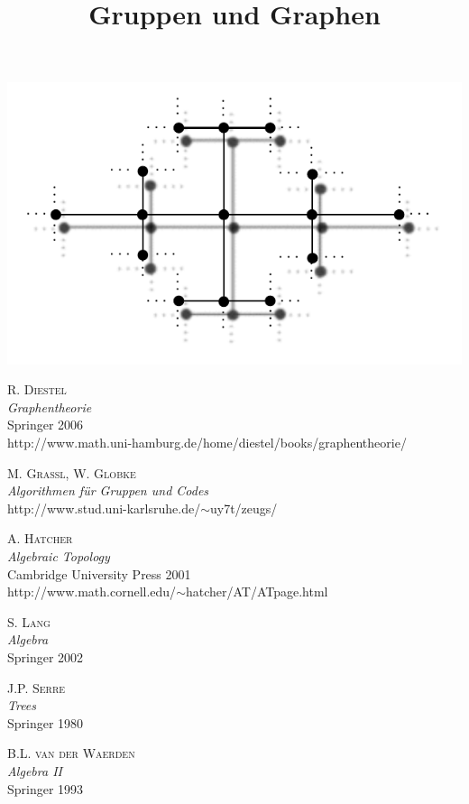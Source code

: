 \documentclass[a4paper, 12pt, twoside]{article}
\title{\Huge \textbf{
\textsf{Gruppen und Graphen}}}
\date{}
\begin{document}
\maketitle
\begin{center}
	\includegraphics{grugraImages/titel}
\end{center}
\newpage
\tableofcontents
\newpage









\appendix



\newpage
\begin{thebibliography}{10}

 \textsc{R. Diestel}\\
\textsl{Graphentheorie}\\
Springer 2006\\
\textsf{http://www.math.uni-hamburg.de/home/diestel/books/graphentheorie/}

 \textsc{M. Grassl, W. Globke}\\
\textsl{Algorithmen für Gruppen und Codes}\\
\textsf{http://www.stud.uni-karlsruhe.de/$\sim$uy7t/zeugs/}

 \textsc{A. Hatcher}\\
\textsl{Algebraic Topology}\\
Cambridge University Press 2001\\
\textsf{http://www.math.cornell.edu/$\sim$hatcher/AT/ATpage.html}

 \textsc{S. Lang}\\
\textsl{Algebra}\\
Springer 2002

 \textsc{J.P. Serre}\\
\textsl{Trees}\\
Springer 1980

 \textsc{B.L. van der Waerden}\\
\textsl{Algebra II}\\
Springer 1993

\end{thebibliography}

\newpage
{}
\small
\printindex
\end{document}
